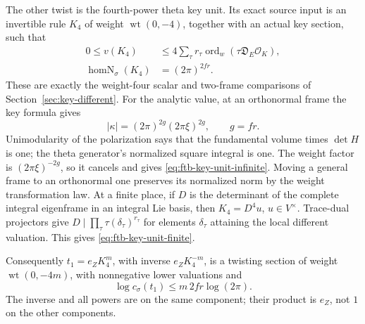 The other twist is the fourth-power theta key unit.
Its exact source input is an invertible rule \(K_4\) of weight
\(\operatorname{wt}(0,-4)\), together with an actual key section,
such that
\begin{align}
 0\le v(K_4)&\le
       4\sum_\tau r_\tau
           \operatorname{ord}_w(\tau\mathfrak D_E\mathcal O_K),
                                                   \label{eq:ftb-key-unit-finite}\\
 \operatorname{homN}_\sigma(K_4)&=(2\pi)^{2fr}.
                                                   \label{eq:ftb-key-unit-infinite}
\end{align}
These are exactly the weight-four scalar and two-frame
comparisons of Section~\ref{sec:key-different}.
For the analytic value, at an orthonormal frame the key formula
gives
\[
 |\kappa|=(2\pi)^{2g}(2\pi\xi)^{2g},\qquad g=fr .
\]
Unimodularity of the polarization says that the fundamental
volume times \(\det H\) is one; the theta generator's normalized
square integral is one.
The weight factor is \((2\pi\xi)^{-2g}\), so it cancels and gives
\eqref{eq:ftb-key-unit-infinite}.
Moving a general frame to an orthonormal one preserves its
normalized norm by the weight transformation law.
At a finite place, if \(D\) is the determinant of the complete
integral eigenframe in an integral Lie basis, then
\(K_4=D^4u\), \(u\in V^\times\).
Trace-dual projectors give
\(D\mid\prod_\tau\tau(\delta_\tau)^{r_\tau}\) for elements
\(\delta_\tau\) attaining the local different valuation.
This gives \eqref{eq:ftb-key-unit-finite}.

Consequently \(t_1=e_ZK_4^m\), with inverse \(e_ZK_4^{-m}\),
is a twisting section of weight \(\operatorname{wt}(0,-4m)\),
with nonnegative lower valuations and
\[
                \log c_\sigma(t_1)\le m\,2fr\log(2\pi).
\]
The inverse and all powers are on the same component; their
product is \(e_Z\), not \(1\) on the other components.

